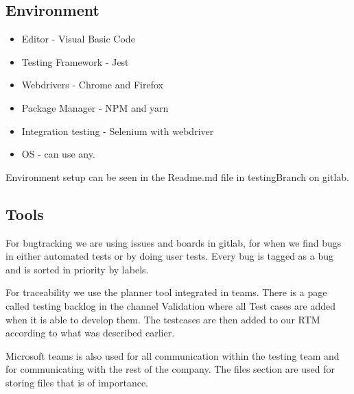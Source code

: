 \subsection{Environment}
\begin{itemize}
    \item Editor - Visual Basic Code
    \item Testing Framework - Jest
    \item Webdrivers - Chrome and Firefox
    \item Package Manager - NPM and yarn
    \item Integration testing - Selenium with webdriver
    \item OS - can use any.
\end{itemize}

Environment setup can be seen in the Readme.md file in testingBranch on gitlab. 

\subsection{Tools}
For bugtracking we are using issues and boards in gitlab, for when we find bugs in either automated tests or by doing user tests. Every bug is tagged as a bug and is sorted in priority by labels. 

For traceability we use the planner tool integrated in teams. There is a page called testing backlog in the channel Validation where all Test cases are added when it is able to develop them. The testcases are then added to our RTM according to what was described earlier. 

Microsoft teams is also used for all communication within the testing team and for communicating with the rest of the company. The files section are used for storing files that is of importance.



